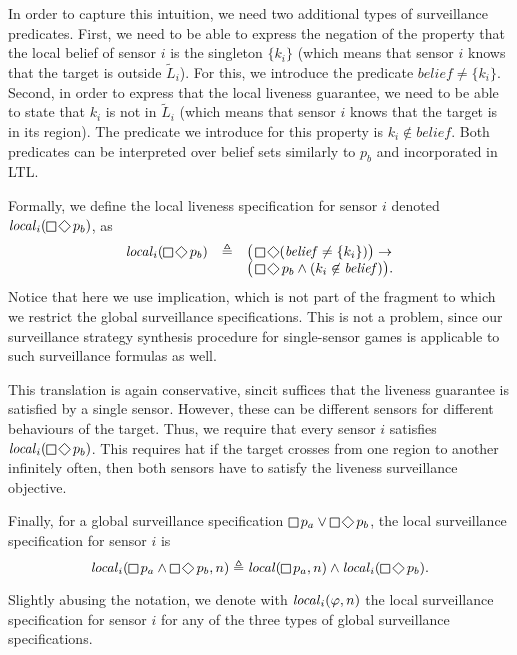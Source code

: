 In order to capture this intuition, we need two additional types of surveillance predicates. First, we need to be able to express the negation of the property that the local belief of sensor $i$ is the singleton $\{k_i\}$ (which means that sensor $i$ knows that the target is outside $\widetilde L_i$). For this, we introduce the predicate $\mathit{belief} \neq \{k_i\}$. Second, in order to express that the local liveness guarantee, we need to be able to state that $k_i$ is not in $\widetilde L_i$ (which means that sensor $i$ knows that the target is in its region). The predicate we introduce for this property is $k_i \not\in\mathit{belief}$. Both predicates can be interpreted over belief sets similarly to $p_b$ and incorporated in LTL.
 
Formally, we define the local liveness specification for sensor $i$ denoted $\locspec_i(\LTLglobally\LTLfinally p_b)$, as
\[
\begin{array}{lll}
\locspec_i(\LTLglobally\LTLfinally p_b) & \triangleq &
\big(\LTLglobally\LTLfinally (\mathit{belief} \neq \{k_i\} )\big)\rightarrow\\&& \big(\LTLglobally\LTLfinally p_b \wedge (k_i \not\in\mathit{belief})\big).
\end{array}
\]
Notice that here we use implication, which is not part of the fragment to which we restrict the global surveillance specifications. This is not a problem, since our surveillance strategy synthesis procedure for single-sensor games is applicable to such surveillance formulas as well.

This translation is again conservative, sincit suffices that the liveness guarantee is satisfied by a single sensor. However, these can be different sensors for different behaviours of the target. Thus, we require that every sensor $i$ satisfies $\locspec_i(\LTLglobally\LTLfinally p_b)$. This requires hat if the target crosses from one region to another infinitely often, then both sensors have to satisfy the liveness surveillance objective.

Finally, for a global surveillance specification $\LTLglobally p_a \vee \LTLglobally\LTLfinally p_b$, the local surveillance specification for sensor $i$ is
\[\locspec_i(\LTLglobally p_a\wedge  \LTLglobally\LTLfinally p_b,n)\triangleq
\locspec(\LTLglobally p_a,n) \wedge\locspec_i(\LTLglobally\LTLfinally p_b) .
\]

Slightly abusing the notation, we denote with $\mathit{local}_i(\varphi,n)$ the local surveillance specification for sensor $i$ for any of the three types of global surveillance specifications.


